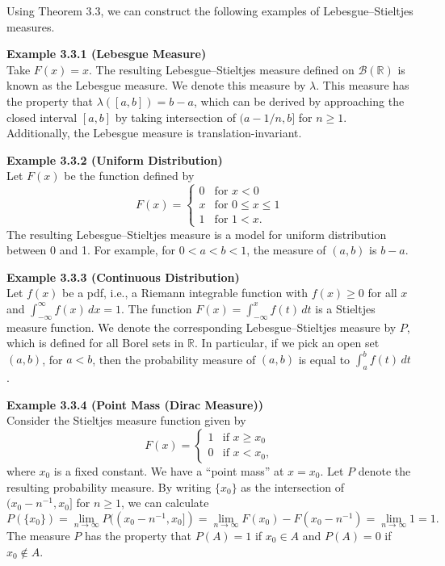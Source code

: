 Using Theorem 3.3, we can construct the following examples of Lebesgue--Stieltjes measures.

\textbf{Example 3.3.1 (Lebesgue Measure)} \\
Take $F(x) = x$. The resulting Lebesgue--Stieltjes measure defined on $\mathcal{B}(\mathbb{R})$ is known as the Lebesgue measure. We denote this measure by $\lambda$. This measure has the property that $\lambda([a, b]) = b - a$, which can be derived by approaching the closed interval $[a, b]$ by taking intersection of $(a - 1/n, b]$ for $n \ge 1$. Additionally, the Lebesgue measure is translation-invariant.

\textbf{Example 3.3.2 (Uniform Distribution)} \\
Let $F(x)$ be the function defined by
\[
F(x) = \begin{cases} 
0 & \text{for } x < 0 \\ 
x & \text{for } 0 \le x \le 1 \\ 
1 & \text{for } 1 < x. 
\end{cases}
\]
The resulting Lebesgue--Stieltjes measure is a model for uniform distribution between 0 and 1. For example, for $0 < a < b < 1$, the measure of $(a, b)$ is $b - a$.

\textbf{Example 3.3.3 (Continuous Distribution)} \\
Let $f(x)$ be a pdf, i.e., a Riemann integrable function with $f(x) \ge 0$ for all $x$ and $\int_{-\infty}^\infty f(x) \, dx = 1$. The function $F(x) = \int_{-\infty}^x f(t) \, dt$ is a Stieltjes measure function. We denote the corresponding Lebesgue--Stieltjes measure by $P$, which is defined for all Borel sets in $\mathbb{R}$. In particular, if we pick an open set $(a, b)$, for $a < b$, then the probability measure of $(a, b)$ is equal to $\int_a^b f(t) \, dt$.

\textbf{Example 3.3.4 (Point Mass (Dirac Measure))} \\
Consider the Stieltjes measure function given by
\[
F(x) = \begin{cases} 
1 & \text{if } x \ge x_0 \\ 
0 & \text{if } x < x_0, 
\end{cases}
\]
where $x_0$ is a fixed constant. We have a ``point mass'' at $x = x_0$. Let $P$ denote the resulting probability measure. By writing $\{x_0\}$ as the intersection of $(x_0 - n^{-1}, x_0]$ for $n \ge 1$, we can calculate
\[
P(\{x_0\}) = \lim_{n \to \infty} P((x_0 - n^{-1}, x_0]) = \lim_{n \to \infty} F(x_0) - F(x_0 - n^{-1}) = \lim_{n \to \infty} 1 = 1.
\]
The measure $P$ has the property that $P(A) = 1$ if $x_0 \in A$ and $P(A) = 0$ if $x_0 \notin A$.

